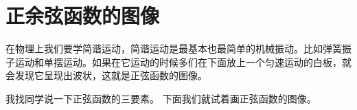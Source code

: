 \documentclass{article}
\begin{document}
\section{正余弦函数的图像}
在物理上我们要学简谐运动，简谐运动是最基本也最简单的机械振动。比如弹簧振子运动和单摆运动。如果在它运动的时候多们在下面放上一个匀速运动的白板，就会发现它呈现出波状，这就是正弦函数的图像。

我找同学说一下正弦函数的三要素。
下面我们就试着画正弦函数的图像。
\end{document}
